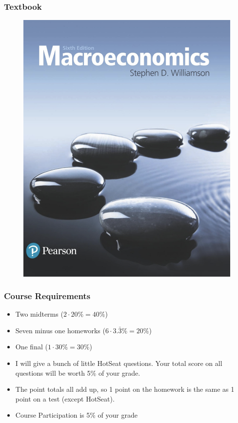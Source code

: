 \documentclass{beamer}
\begin{document}
\begin{frame}
\frametitle[alignment=center]{Textbook}
\begin{figure}
\centering
\includegraphics[scale=0.3]{Williamson.png}
\end{figure}
\end{frame}

\begin{frame}
\frametitle[alignment=center]{Course Requirements}
\begin{itemize}
\item Two midterms ($2\cdot20\%=40\%$)
\bigskip
\item Seven minus one homeworks ($6\cdot3.\bar{3}\%=20\%$)
\bigskip
\item One final ($1\cdot30\%=30\%$)
\bigskip
\item I will give a bunch of little HotSeat questions.  Your total score on all questions will be worth 5\% of your grade.
\bigskip
\item The point totals all add up, so 1 point on the homework is the same as 1 point on a test (except HotSeat).  
\bigskip
\item Course Participation is 5\%  of your grade
\end{itemize}
\end{frame}
\end{document}
